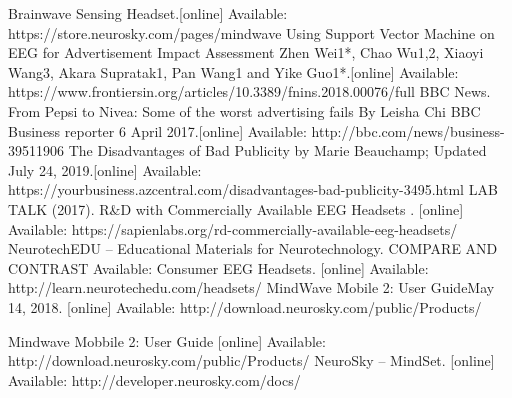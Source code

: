 \documentclass[a4paper, 12pt, oneside]{uet_thesis}
\begin{document}
\begin{thebibliography}{00}
 Brainwave Sensing Headset.[online] Available: https://store.neurosky.com/pages/mindwave
 Using Support Vector Machine on EEG for Advertisement Impact Assessment Zhen Wei1*, Chao Wu1,2, Xiaoyi Wang3, Akara Supratak1, Pan Wang1 and Yike Guo1*.[online] Available: https://www.frontiersin.org/articles/10.3389/fnins.2018.00076/full
 BBC News. From Pepsi to Nivea: Some of the worst advertising fails By Leisha Chi BBC Business reporter 6 April 2017.[online] Available: http://bbc.com/news/business-39511906
 The Disadvantages of Bad Publicity by Marie Beauchamp; Updated July 24, 2019.[online] Available: https://yourbusiness.azcentral.com/disadvantages-bad-publicity-3495.html
 LAB TALK (2017). R\&D with Commercially Available EEG Headsets . [online] Available: https://sapienlabs.org/rd-commercially-available-eeg-headsets/
 NeurotechEDU – Educational Materials for Neurotechnology. COMPARE AND CONTRAST Available: Consumer EEG Headsets. [online] Available: http://learn.neurotechedu.com/headsets/
 MindWave Mobile 2: User GuideMay 14, 2018. [online] Available: http://download.neurosky.com/public/Products/

Mindwave Mobbile 2: User Guide [online] Available: http://download.neurosky.com/public/Products/
NeuroSky – MindSet. [online] Available: http://developer.neurosky.com/docs/



\end{thebibliography}


%
\end{document}
